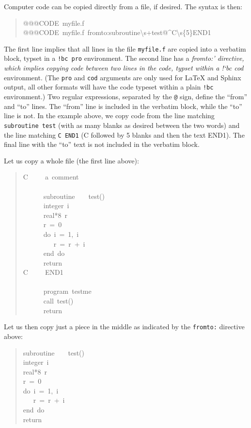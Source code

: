 \documentclass[a4paper,english]{article}
\providecommand*{\DUroletitlereference}[1]{\textsl{#1}}
\begin{document}
Computer code can be copied directly from a file, if desired. The syntax
is then:
%
\begin{quote}{\ttfamily \raggedright \noindent
@@@CODE~myfile.f\\
@@@CODE~myfile.f~fromto:subroutine\textbackslash{}s+test@\textasciicircum{}C\textbackslash{}s\{5\}END1
}
\end{quote}

The first line implies that all lines in the file \texttt{myfile.f} are
copied into a verbatim block, typset in a \texttt{!bc pro} environment.  The
second line has a \DUroletitlereference{fromto:' directive, which implies copying code
between two lines in the code, typset within a !`bc cod}
environment. (The \texttt{pro} and \texttt{cod} arguments are only used for LaTeX
and Sphinx output, all other formats will have the code typeset within
a plain \texttt{!bc} environment.) Two regular expressions, separated by the
\texttt{@} sign, define the ``from'' and ``to'' lines.  The ``from'' line is
included in the verbatim block, while the ``to'' line is not. In the
example above, we copy code from the line matching \texttt{subroutine test}
(with as many blanks as desired between the two words) and the line
matching \texttt{C END1} (C followed by 5 blanks and then the text END1). The
final line with the ``to'' text is not included in the verbatim block.

Let us copy a whole file (the first line above):
%
\begin{quote}{\ttfamily \raggedright \noindent
C~~~~~a~comment\\
~\\
~~~~~~subroutine~~~~test()\\
~~~~~~integer~i\\
~~~~~~real*8~r\\
~~~~~~r~=~0\\
~~~~~~do~i~=~1,~i\\
~~~~~~~~~r~=~r~+~i\\
~~~~~~end~do\\
~~~~~~return\\
C~~~~~END1\\
~\\
~~~~~~program~testme\\
~~~~~~call~test()\\
~~~~~~return
}
\end{quote}

Let us then copy just a piece in the middle as indicated by the \texttt{fromto:}
directive above:
%
\begin{quote}{\ttfamily \raggedright \noindent
subroutine~~~~test()\\
integer~i\\
real*8~r\\
r~=~0\\
do~i~=~1,~i\\
~~~r~=~r~+~i\\
end~do\\
return
}
\end{quote}
\end{document}
